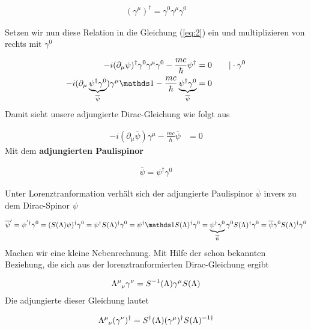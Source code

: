\begin{align}
  \label{eq:4}
  \boxed{ (\gamma^\mu)^\dagger = \gamma^0\gamma^\mu\gamma^0  }
\end{align}

Setzen wir nun diese Relation in die Gleichung (\ref{eq:2}) ein und multiplizieren von rechts mit \(\gamma^0\)

\begin{align}
  \label{eq:5}
  -i(\partial_\mu\psi)^\dagger\gamma^0\gamma^\mu\gamma^0   - \frac{mc}{\hbar}\psi^\dagger &= 0 \qquad |\cdot\gamma^0 \notag\\
-i(\partial_\mu\underbr{\psi^\dagger\gamma^0}_{\overline \psi})\gamma^\mu\mathds 1  - \frac{mc}{\hbar}\underbr{\psi^\dagger\gamma^0}_{\overline \psi} &= 0 
\end{align}
Damit sieht unsere adjungierte Dirac-Gleichung wie folgt aus

\begin{align}
  \label{eq:6}
  -i(\partial_\mu\overline \psi)\gamma^\mu  - \frac{mc}{\hbar}\overline \psi &= 0 
\end{align}
Mit dem \textbf{adjungierten Paulispinor} 

\begin{align}
  \label{eq:7}
  \boxed{\overline \psi = \psi^\dagger\gamma^0}
\end{align}

Unter Lorenztranformation verhält sich der adjungierte Paulispinor \(\overline \psi\)  invers zu dem Dirac-Spinor \(\psi\)

\begin{align}
  \label{eq:8}
  \overline \psi'= \psi^{'\dagger}\gamma^0  = (S(\Lambda)\psi)^\dagger\gamma^0 = \psi^\dagger S(\Lambda)^\dagger \gamma^0 = \psi^\dagger\mathds 1 S(\Lambda)^\dagger \gamma^0 = \underbr{\psi^\dagger \gamma^0}_{\overline\psi}\gamma^0 S(\Lambda)^\dagger \gamma^0  =  \overline\psi \gamma^0 S(\Lambda)^\dagger \gamma^0 
\end{align}
Machen wir eine kleine Nebenrechnung. Mit Hilfe der schon bekannten Beziehung, die sich aus der lorenztranformierten Dirac-Gleichung ergibt

\begin{align}
  \label{eq:9}
  \Lambda^{\mu}_{\hphantom \mu \nu} \gamma^\nu = S^{-1}(\Lambda)\gamma^\mu  S(\Lambda)
\end{align}
Die adjungierte dieser Gleichung lautet

\begin{align}
  \label{eq:10}
   \Lambda^{\mu}_{\hphantom \mu \nu} (\gamma^\nu)^\dagger = S^\dagger(\Lambda)(\gamma^\mu)^\dagger S(\Lambda)^{-1\dagger}
\end{align}

